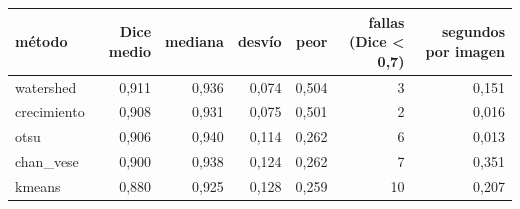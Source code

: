 \begin{tabular}{lrrrrrr}
\toprule
método & Dice medio & mediana & desvío & peor & fallas (Dice < 0,7) & segundos por imagen \\
\midrule
watershed & 0{,}911 & 0{,}936 & 0{,}074 & 0{,}504 & 3 & 0{,}151 \\
crecimiento & 0{,}908 & 0{,}931 & 0{,}075 & 0{,}501 & 2 & 0{,}016 \\
otsu & 0{,}906 & 0{,}940 & 0{,}114 & 0{,}262 & 6 & 0{,}013 \\
chan_vese & 0{,}900 & 0{,}938 & 0{,}124 & 0{,}262 & 7 & 0{,}351 \\
kmeans & 0{,}880 & 0{,}925 & 0{,}128 & 0{,}259 & 10 & 0{,}207 \\
\bottomrule
\end{tabular}
